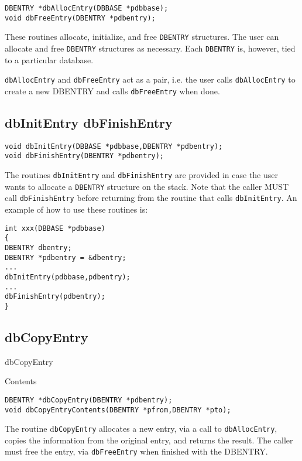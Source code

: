 \begin{verbatim}DBENTRY *dbAllocEntry(DBBASE *pdbbase);
void dbFreeEntry(DBENTRY *pdbentry);
\end{verbatim}
These routines allocate, initialize, and free \verb|DBENTRY| structures. The user can allocate and free \verb|DBENTRY| structures as 
necessary. Each \verb|DBENTRY| is, however, tied to a particular database.

\verb|dbAllocEntry| and \verb|dbFreeEntry| act as a pair, i.e. the user calls \verb|dbAllocEntry| to create a new DBENTRY and 
calls \verb|dbFreeEntry| when done.

\subsection{dbInitEntry dbFinishEntry}

\begin{verbatim}void dbInitEntry(DBBASE *pdbbase,DBENTRY *pdbentry);
void dbFinishEntry(DBENTRY *pdbentry);
\end{verbatim}
The routines \verb|dbInitEntry| and \verb|dbFinishEntry| are provided in case the user wants to allocate a \verb|DBENTRY| structure 
on the stack. Note that the caller MUST call \verb|dbFinishEntry| before returning from the routine that calls 
\verb|dbInitEntry|. An example of how to use these routines is:

\begin{verbatim}int xxx(DBBASE *pdbbase)
{
DBENTRY dbentry;
DBENTRY *pdbentry = &dbentry;
...
dbInitEntry(pdbbase,pdbentry);
...
dbFinishEntry(pdbentry);
}

\end{verbatim}\subsection{dbCopyEntry}

dbCopyEntry

Contents

\begin{verbatim}DBENTRY *dbCopyEntry(DBENTRY *pdbentry);
void dbCopyEntryContents(DBENTRY *pfrom,DBENTRY *pto);
\end{verbatim}
The routine d\verb|bCopyEntry| allocates a new entry, via a call to \verb|dbAllocEntry|, copies the information from the original 
entry, and returns the result. The caller must free the entry, via \verb|dbFreeEntry| when finished with the DBENTRY.

